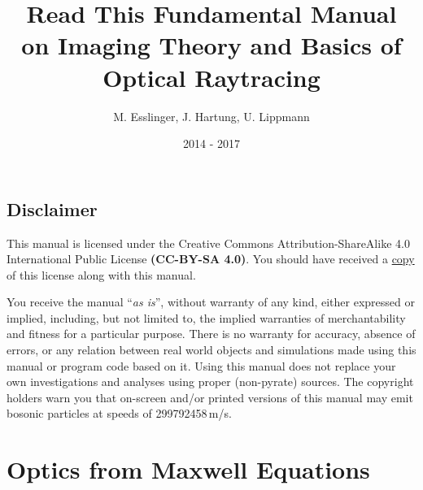 \documentclass[12pt,a4paper,twoside,openright,BCOR10mm,headsepline,titlepage,abstracton,chapterprefix,final]{scrreprt}
\begin{document}

\titlehead{ }
\subject{Pyrate -- Optical raytracing based on Python}
\title{Read This Fundamental Manual \\ on Imaging Theory and Basics of Optical Raytracing}
\author{M. Esslinger, J. Hartung, U. Lippmann}
\date{2014 - 2017}
\publishers{}
\maketitle

\onehalfspacing

\tableofcontents

\cleardoublepage


\singlespacing

\section{Disclaimer}

This manual is licensed under the
Creative Commons Attribution-ShareAlike 4.0 International Public License
\textbf{(CC-BY-SA 4.0)}.
You should have received a \href{rtfm_license.html}{copy} of this license along with this manual.

You receive the manual ``\emph{as is}'', without warranty of any kind, either expressed or implied, 
including, but not limited to, the implied warranties of merchantability and fitness for a particular purpose.
There is no warranty for accuracy, absence of errors, or any relation between real world objects and simulations made 
using this manual or program code based on it.
Using this manual does not replace your own investigations and analyses using proper (non-pyrate) sources. 
The copyright holders warn you that on-screen and/or printed versions of this manual may emit bosonic particles at speeds of 299792458\,m/s.

\chapter{Optics from Maxwell Equations}
\end{document}

